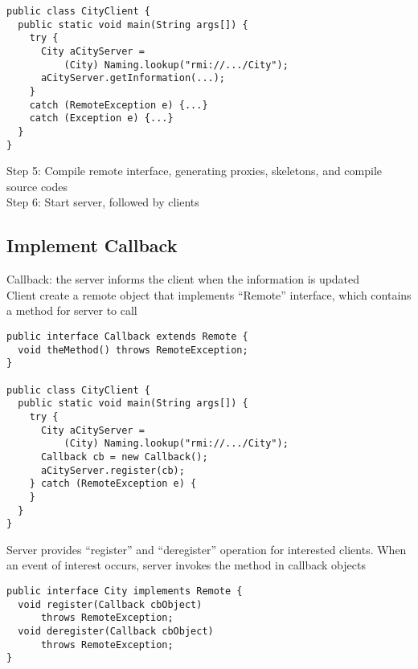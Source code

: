 \begin{multicols*}{2}
\begin{verbatim}
public class CityClient {
  public static void main(String args[]) {
    try {
      City aCityServer = 
          (City) Naming.lookup("rmi://.../City");
      aCityServer.getInformation(...);
    } 
    catch (RemoteException e) {...}
    catch (Exception e) {...}
  }
}
\end{verbatim}

\noindent Step 5: Compile remote interface, generating proxies, skeletons, and compile source codes\\

\noindent Step 6: Start server, followed by clients

\subsection{Implement Callback}

\noindent Callback: the server informs the client when the information is updated\\

\noindent Client create a remote object that implements “Remote” interface, which contains a method for server to call

\begin{verbatim}
public interface Callback extends Remote {
  void theMethod() throws RemoteException;
}

public class CityClient {
  public static void main(String args[]) {
    try {
      City aCityServer = 
          (City) Naming.lookup("rmi://.../City");
      Callback cb = new Callback();
      aCityServer.register(cb);
    } catch (RemoteException e) {
    }
  }
}
\end{verbatim}

\noindent Server provides “register” and “deregister” operation for interested clients. When an event of interest occurs, server invokes the method in callback objects

\begin{verbatim}
public interface City implements Remote {
  void register(Callback cbObject) 
      throws RemoteException;
  void deregister(Callback cbObject) 
      throws RemoteException;
}
\end{verbatim}

\end{multicols*}
